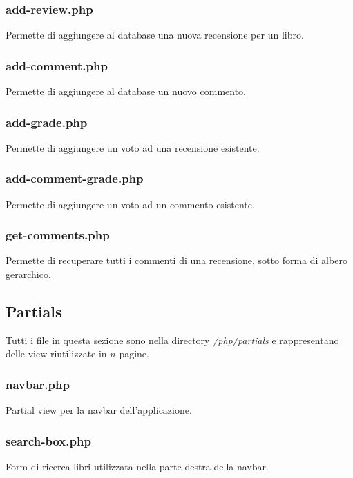 \documentclass[italian]{article}
\begin{document}
\subsubsection{add-review.php}
Permette di aggiungere al database una nuova recensione per un libro.


\subsubsection{add-comment.php}
Permette di aggiungere al database un nuovo commento.


\subsubsection{add-grade.php}
Permette di aggiungere un voto ad una recensione esistente.


\subsubsection{add-comment-grade.php}
Permette di aggiungere un voto ad un commento esistente.


\subsubsection{get-comments.php}
Permette di recuperare tutti i commenti di una recensione, sotto forma di albero gerarchico.


\subsection{Partials}
Tutti i file in questa sezione sono nella directory \textit{/php/partials} e rappresentano delle view riutilizzate in $n$ pagine.

\subsubsection{navbar.php}
Partial view per la navbar dell'applicazione.


\subsubsection{search-box.php}
Form di ricerca libri utilizzata nella parte destra della navbar.

\end{document}
